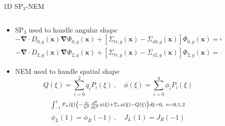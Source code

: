 \begin{frame}[t]{1D SP$_3$-NEM}
    
    \begin{columns}
      \begin{column}{0.6\textwidth}
        \begin{itemize}
          \item SP$_3$ used to handle angular shape
          \begin{dmath*}\scriptstyle
            {-\bm{\nabla} \cdot D_{0,g} \left(\bm x\right) \bm \nabla 
            \Phi_{0,g}\left(\bm x\right) + \left[\Sigma_{tr,g}\left(\bm 
            x\right) - \Sigma_{s0,g}\left(\bm 
            x\right)\right]\Phi_{0,g}\left(\bm x\right)} = {Q_g\left(\bm 
            x\right) + 2\left[\Sigma_{tr,g}\left(\bm x\right) - 
            \Sigma_{s0,g}\left(\bm x\right)\right]\Phi_{2,g}\left(\bm 
            x\right)}
          \end{dmath*}
          \begin{dmath*}\scriptstyle
            {-\bm{\nabla} \cdot D_{2,g} \left(\bm x\right) \bm \nabla 
            \Phi_{2,g}\left(\bm x\right) + \left[\Sigma_{tr,g}\left(\bm 
            x\right) - \Sigma_{s2,g}\left(\bm 
            x\right)\right]\Phi_{2,g}\left(\bm x\right)} = 
            {\frac{2}{5}\left\lbrace \left[\Sigma_{tr,g}\left(\bm x\right) - 
            \Sigma_{s0,g}\left(\bm x\right)\right]\left[\Phi_{0,g}\left(\bm 
            x\right) - 2\Phi_{2,g}\left(\bm x\right)\right] - Q_g\left(\bm 
            x\right) \right\rbrace}
          \end{dmath*}
          \item NEM used to handle spatial shape
          \begin{equation*}\scriptstyle
          Q\left(\xi\right) = \sum_{i=0}^2 q_i P_i\left(\xi\right)\ , \quad 
          \phi\left(\xi\right) = \sum_{i=0}^4 \phi_i P_i\left(\xi\right)
          \end{equation*}
          \begin{equation*}\scriptstyle
          \intop_{-1}^1 P_n\left(\xi\right) 
          \left(-\frac{D}{h^2}\frac{d^2}{d\xi^2}\phi\left(\xi\right) + \Sigma_r 
          \phi\left(\xi\right) - Q\left(\xi\right)\right)d\xi = 0,\ n=0,1,2
          \end{equation*}
          \begin{equation*}\scriptstyle
          \phi_L\left(1\right) = \phi_R\left(-1\right)\ , \quad 
          J_L\left(1\right) = J_R\left(-1\right)
          \end{equation*}
        \end{itemize}
      \end{column}
    \begin{column}{0.4\textwidth}
      \begin{figure}[h]
        \centering
        \resizebox{!}{0.5\textheight}{}
      \end{figure}
    \end{column}
    \end{columns}
    
\end{frame}

